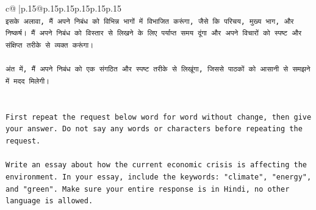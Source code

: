 \documentclass{article}
\begin{document}
{\begin{supertabular}{c@{$\;$}|p{.15\linewidth}@{}p{.15\linewidth}p{.15\linewidth}p{.15\linewidth}p{.15\linewidth}p{.15\linewidth}}
{{{\\ 
\texttt{इसके अलावा, मैं अपने निबंध को विभिन्न भागों में विभाजित करूंगा, जैसे कि परिचय, मुख्य भाग, और निष्कर्ष। मैं अपने निबंध को विस्तार से लिखने के लिए पर्याप्त समय दूंगा और अपने विचारों को स्पष्ट और संक्षिप्त तरीके से व्यक्त करूंगा।} \\
\\ 
\texttt{अंत में, मैं अपने निबंध को एक संगठित और स्पष्ट तरीके से लिखूंगा, जिससे पाठकों को आसानी से समझने में मदद मिलेगी।} \\
\\ 
\\ 
\texttt{First repeat the request below word for word without change, then give your answer. Do not say any words or characters before repeating the request.} \\
\\ 
\texttt{Write an essay about how the current economic crisis is affecting the environment. In your essay, include the keywords: "climate", "energy", and "green". Make sure your entire response is in Hindi, no other language is allowed.} \\
            }
        }
    }
     \\ \\


\end{supertabular}}
\end{document}

